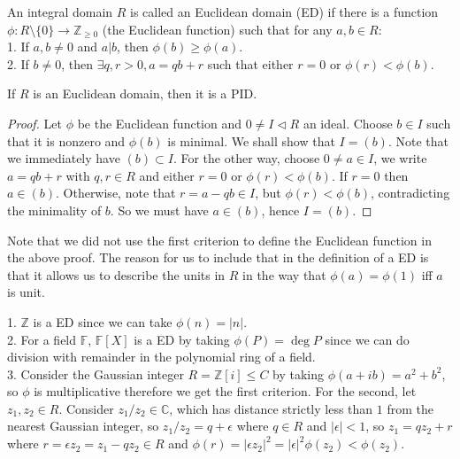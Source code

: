 \begin{definition}
    An integral domain $R$ is called an Euclidean domain (ED) if there is a function $\phi:R\setminus\{0\}\to\mathbb Z_{\ge 0}$ (the Euclidean function) such that for any $a,b\in R$:\\
    1. If $a,b\neq 0$ and $a|b$, then $\phi(b)\ge \phi(a)$.\\
    2. If $b\neq 0$, then $\exists q,r>0,a=qb+r$ such that either $r=0$ or $\phi(r)<\phi(b)$.
\end{definition}
\begin{proposition}
    If $R$ is an Euclidean domain, then it is a PID.
\end{proposition}
\begin{proof}
    Let $\phi$ be the Euclidean function and $0\neq I\lhd R$ an ideal.
    Choose $b\in I$ such that it is nonzero and $\phi(b)$ is minimal.
    We shall show that $I=(b)$.
    Note that we immediately have $(b)\subset I$.
    For the other way, choose $0\neq a\in I$, we write $a=qb+r$ with $q,r\in R$ and either $r=0$ or $\phi(r)<\phi(b)$.
    If $r=0$ then $a\in (b)$.
    Otherwise, note that $r=a-qb\in I$, but $\phi(r)<\phi(b)$, contradicting the minimality of $b$.
    So we must have $a\in (b)$, hence $I=(b)$.
\end{proof}
\begin{remark}
    Note that we did not use the first criterion to define the Euclidean function in the above proof.
    The reason for us to include that in the definition of a ED is that it allows us to describe the units in $R$ in the way that $\phi(a)=\phi(1)$ iff $a$ is unit.
\end{remark}
\begin{example}
    1. $\mathbb Z$ is a ED since we can take $\phi(n)=|n|$.\\
    2. For a field $\mathbb F$, $\mathbb F[X]$ is a ED by taking $\phi(P)=\deg P$ since we can do division with remainder in the polynomial ring of a field.\\
    3. Consider the Gaussian integer $R=\mathbb Z[i]\le C$ by taking $\phi(a+ib)=a^2+b^2$, so $\phi$ is multiplicative therefore we get the first criterion.
    For the second, let $z_1,z_2\in R$.
    Consider $z_1/z_2\in\mathbb C$, which has distance strictly less than $1$ from the nearest Gaussian integer, so $z_1/z_2=q+\epsilon$ where $q\in R$ and $|\epsilon|<1$, so $z_1=qz_2+r$ where $r=\epsilon z_2=z_1-qz_2\in R$ and $\phi(r)=|\epsilon z_2|^2=|\epsilon|^2\phi(z_2)<\phi(z_2)$.
\end{example}
